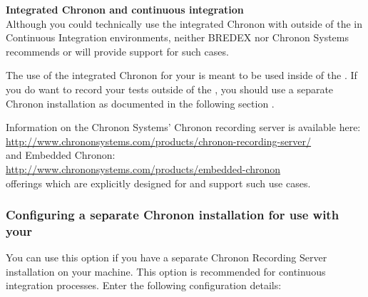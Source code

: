\textbf{Integrated Chronon and continuous integration}\\

Although you could technically use the integrated Chronon with \app{} outside of the \ite{} in Continuous Integration environments, neither BREDEX nor Chronon Systems recommends or will provide support for such cases.

The use of the integrated Chronon for your \gdaut{}  is meant to be used inside of the \ite{}. If you do want to record your tests outside of the \ite{}, you should use a separate Chronon installation as documented in the following section . 

Information on the Chronon Systems' Chronon recording server is available here:\\
 \href{http://www.chrononsystems.com/products/chronon-recording-server/}{http://www.chrononsystems.com/products/chronon-recording-server/}\\
and Embedded Chronon:\\
\href{http://www.chrononsystems.com/products/embedded-chronon}{http://www.chrononsystems.com/products/embedded-chronon} \\
 offerings which are explicitly designed for and support such use cases.


\subsubsection{Configuring a separate Chronon installation for use with your \gdaut{}}
\label{TasksChrononAUTSeparate}

You can use this option if you have a separate Chronon Recording Server installation on your machine. This option is recommended for continuous integration processes.  Enter the following configuration details:

